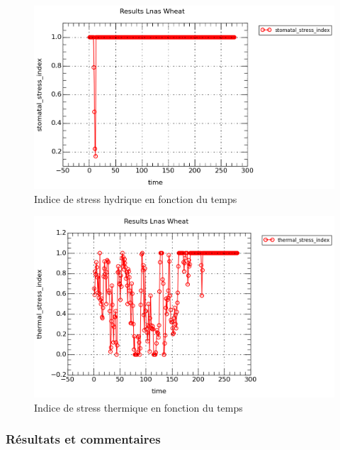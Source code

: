 \begin{figure}[h]

\begin{center}
 \includegraphics[scale = 0.5]{./img/waterStress.png}
 \caption{Indice de stress hydrique en fonction du temps}
 \label{fig:resultatStressH}
\end{center}

\end{figure}

\begin{figure}[h]

\begin{center}
 \includegraphics[scale = 0.5]{./img/thermicStress.png}
 \caption{Indice de stress thermique en fonction du temps}
 \label{fig:resultatStressT}
\end{center}

\end{figure}


\subsubsection{Résultats et commentaires}

